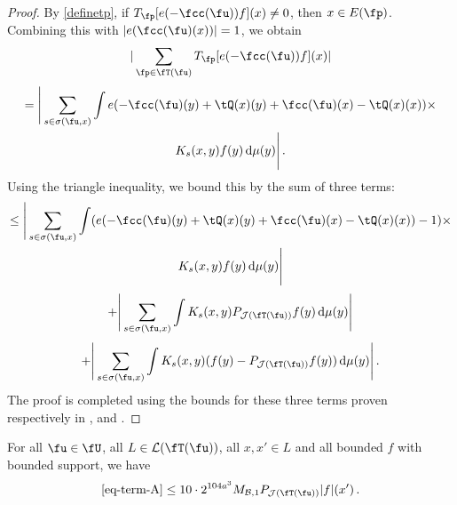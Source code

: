 \begin{proof}
    \leanok
    By \eqref{definetp}, if $T_{\fp}[ e(-\fcc(\fu))f](x) \ne 0$, then $x \in E(\fp)$. Combining this with $|e(\fcc(\fu)(x))| = 1$, we obtain
    $$
        |\sum_{\fp \in \fT(\fu)} T_{\fp}[ e(-\fcc(\fu))f](x)|
    $$
    \begin{multline*}
        = \Bigg| \sum_{s \in \sigma(\fu, x)} \int e(-\fcc(\fu)(y) + \tQ(x)(y) + \fcc(\fu)(x) -\tQ(x)(x))\times\\
        K_s(x,y)f(y) \, \mathrm{d}\mu(y) \Bigg|\,.
    \end{multline*}
    Using the triangle inequality, we bound this by the sum of three terms:
    \begin{multline}
        \label{eq-term-A}
        \le \Bigg| \sum_{s \in \sigma(\fu, x)} \int (e(-\fcc(\fu)(y) + \tQ(x)(y) + \fcc(\fu)(x) -\tQ(x)(x))-1)\times\\
        K_s(x,y)f(y) \, \mathrm{d}\mu(y) \Bigg|
    \end{multline}
    \begin{equation}
        \label{eq-term-B}
        + \Bigg| \sum_{s \in \sigma(\fu, x)} \int K_s(x,y) P_{\mathcal{J}(\fT(\fu))} f(y) \, \mathrm{d}\mu(y) \Bigg|
    \end{equation}
    \begin{equation}
        \label{eq-term-C}
        + \Bigg| \sum_{s \in \sigma(\fu, x)} \int K_s(x,y) (f(y) - P_{\mathcal{J}(\fT(\fu))} f(y)) \, \mathrm{d}\mu(y) \Bigg|\,.
    \end{equation}
    The proof is completed using the bounds for these three terms proven respectively in ,  and .
\end{proof}

\begin{lemma}
    \label{first-tree-pointwise}
    \leanok
    For all $\fu \in \fU$, all $L \in \mathcal{L}(\fT(\fu))$, all $x, x' \in L$ and all bounded $f$ with bounded support, we have
    $$
        \eqref{eq-term-A} \le 10 \cdot 2^{104a^3} M_{\mathcal{B}, 1}P_{\mathcal{J}(\fT(\fu))}|f|(x')\,.
    $$
\end{lemma}

